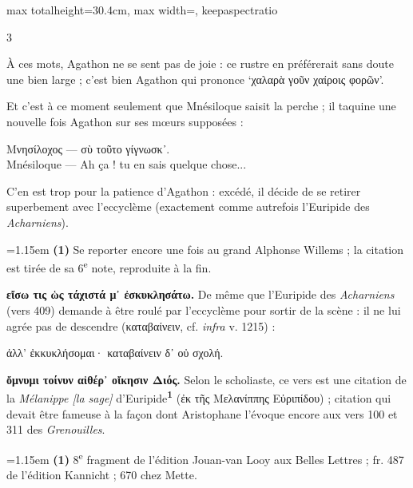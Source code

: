 \documentclass[11pt,twoside]{book}
\newcommand{\italique}[1]{\textit{#1}}
\newcommand{\citComm}[1]{\begin{quoting}[vskip=0.4pt,leftmargin=0.7em,rightmargin=0.2em]#1\end{quoting}}
\newcommand{\nieme}[1]{#1\textsuperscript{e}}
\newlength{\larg}
\newcommand{\marqueur}[1]{\textsuperscript{\color{rubricRed}\textbf{#1}}}
\begin{document}
\begin{adjustbox}{max totalheight=30.4cm, max width=\textwidth, keepaspectratio}
\begin{minipage}{\textwidth}
{\begin{multicols}{3}
\par\vspace{1.5pt}
\noindent À ces mots, Agathon ne se sent pas de joie : ce rustre en préférerait sans doute une bien large ; c'est bien Agathon qui prononce `χαλαρὰ γοῦν χαίροις φορῶν'.
\par\vspace{1.5pt}
\noindent Et c'est à ce moment seulement que Mnésiloque saisit la perche ; il taquine une nouvelle fois Agathon sur ses mœurs supposées :
\citComm{Μνησίλοχος --- σὺ τοῦτο γίγνωσκ᾽.\\
Mnésiloque --- Ah ça ! tu en sais quelque chose...}
\par\vspace{1.5pt}
\noindent C'en est trop pour la patience d'Agathon : excédé, il décide de se retirer superbement avec l'eccyclème (exactement comme autrefois l'Euripide des \italique{Acharniens}).
\par\vspace{1.5pt}
\par\vspace{1.2pt}\par\nopagebreak\vspace{1pt}\noindent\hangindent=1.15em {\color{sepiaNote}\textbf{(1)}} Se reporter encore une fois au grand Alphonse Willems ; la citation est tirée de sa \nieme{6} note, reproduite à la fin.
\par\vspace{1.5pt}
 \textbf{εἴσω τις ὡς τάχιστά μ᾽ ἐσκυκλησάτω.} De même que l'Euripide des \italique{Acharniens} (vers 409) demande à être roulé par l'eccyclème pour sortir de la scène : il ne lui agrée pas de descendre (καταβαίνειν, cf. \italique{infra} v. 1215) :
\citComm{ἀλλ' ἐκκυκλήσομαι· καταβαίνειν δ᾽ οὐ σχολή.}
\par\vspace{1.5pt}
 \textbf{ὄμνυμι τοίνυν αἰθέρ᾽ οἴκησιν Διός.} Selon le scholiaste, ce vers est une citation de la \italique{Mélanippe [la sage]} d'Euripide\marqueur{1} (ἐκ τῆς Μελανίππης Εὐριπίδου) ; citation qui devait être fameuse à la façon dont Aristophane l'évoque encore aux vers 100 et 311 des \italique{Grenouilles}.
\par\vspace{1.5pt}
\par\vspace{1.2pt}\par\nopagebreak\vspace{1pt}\noindent\hangindent=1.15em {\color{sepiaNote}\textbf{(1)}} \nieme{8} fragment de l'édition Jouan-van Looy aux Belles Lettres ; fr. 487 de l'édition Kannicht ; 670 chez Mette.

\end{multicols}}
\end{minipage}
\end{adjustbox}
\end{document}
